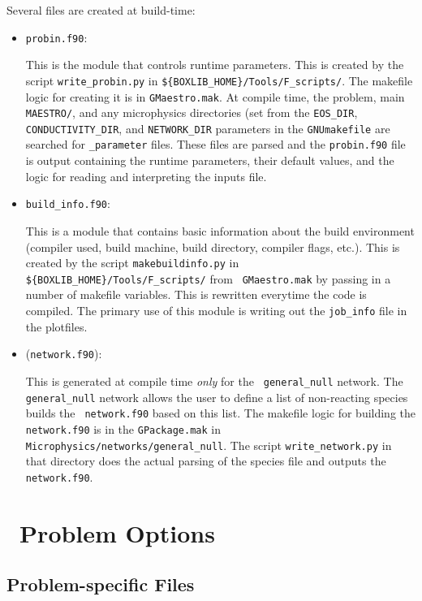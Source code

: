 Several files are created at build-time:
\begin{itemize}
\item {\tt probin.f90}:

  This is the module that controls runtime parameters.  This is
  created by the script
  {\tt write\_probin.py} in {\tt \$\{BOXLIB\_HOME\}/Tools/F\_scripts/}.  The
  makefile logic for creating it is in {\tt GMaestro.mak}.  At compile
  time, the problem, main {\tt MAESTRO/}, and any microphysics
  directories (set from the {\tt EOS\_DIR}, {\tt CONDUCTIVITY\_DIR}, and {\tt NETWORK\_DIR} parameters in the {\tt GNUmakefile}
  are searched for {\tt \_parameter} files.  These files
  are parsed and the {\tt probin.f90} file is output containing the 
  runtime parameters, their default values, and the logic for reading
  and interpreting the inputs file.

\item {\tt build\_info.f90}:

  This is a module that contains basic information about the build
  environment (compiler used, build machine, build directory, compiler
  flags, etc.).  This is created by the script {\tt makebuildinfo.py}
  in {\tt \$\{BOXLIB\_HOME\}/Tools/F\_scripts/} from {\tt
  GMaestro.mak} by passing in a number of makefile variables.  This is
  rewritten everytime the code is compiled.  The primary use of this
  module is writing out the {\tt job\_info} file in the plotfiles.

\item ({\tt network.f90}):

  This is generated at compile time {\em only} for the {\tt
  general\_null} network.  The {\tt general\_null} network allows the
  user to define a list of non-reacting species builds the {\tt
  network.f90} based on this list.  The makefile logic for building
  the {\tt network.f90} is in the {\tt GPackage.mak} in {\tt
  Microphysics/networks/general\_null}.  The script {\tt write\_network.py}
  in that directory does the actual parsing of the species file and
  outputs the {\tt network.f90}.


\end{itemize}



\section{\maestro\ Problem Options}

\subsection{Problem-specific Files}
\label{sec:make:otherfiles}

